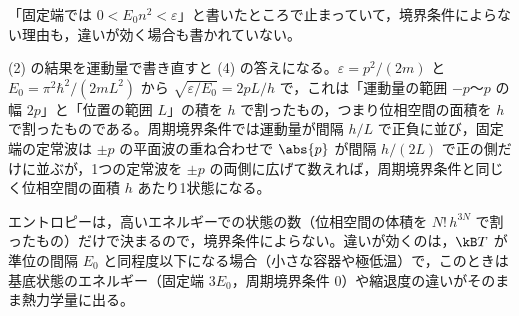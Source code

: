 \begin{kotaeran}
   「固定端では $0<E_{0}n^{2}<\varepsilon$」と書いたところで止まっていて，境界条件によらない理由も，違いが効く場合も書かれていない。
\end{kotaeran}
\begin{rikai}
  \item (2) の結果を運動量で書き直すと (4) の答えになる。$\varepsilon=p^{2}/(2m)$ と $E_{0}=\pi^{2}\hbar^{2}/(2mL^{2})$ から $\sqrt{\varepsilon/E_{0}}=2pL/h$ で，これは「運動量の範囲 $-p$〜$p$ の幅 $2p$」と「位置の範囲 $L$」の積を $h$ で割ったもの，つまり位相空間の面積を $h$ で割ったものである。周期境界条件では運動量が間隔 $h/L$ で正負に並び，固定端の定常波は $\pm p$ の平面波の重ね合わせで $\abs{p}$ が間隔 $h/(2L)$ で正の側だけに並ぶが，1つの定常波を $\pm p$ の両側に広げて数えれば，周期境界条件と同じく位相空間の面積 $h$ あたり1状態になる。
  \item エントロピーは，高いエネルギーでの状態の数（位相空間の体積を $N!\,h^{3N}$ で割ったもの）だけで決まるので，境界条件によらない。違いが効くのは，$\kB T$ が準位の間隔 $E_{0}$ と同程度以下になる場合（小さな容器や極低温）で，このときは基底状態のエネルギー（固定端 $3E_{0}$，周期境界条件 $0$）や縮退度の違いがそのまま熱力学量に出る。
\end{rikai}
